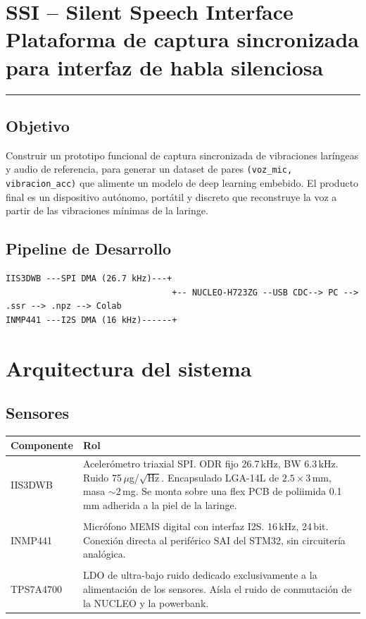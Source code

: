\documentclass[10pt,a4paper]{article}
\begin{document}
\section*{SSI -- Silent Speech Interface\\\smallskip
\small Plataforma de captura sincronizada para interfaz de habla silenciosa}

\vspace{-0.3cm}
\noindent\rule{\textwidth}{0.4pt}
\vspace{0.3cm}

\subsection*{Objetivo}

Construir un prototipo funcional de captura sincronizada de vibraciones laríngeas
y audio de referencia, para generar un dataset de pares
\texttt{(voz\_mic, vibracion\_acc)} que alimente un modelo de deep learning
embebido. El producto final es un dispositivo autónomo, portátil y discreto que
reconstruye la voz a partir de las vibraciones mínimas de la laringe.

\subsection*{Pipeline de Desarrollo}

\begin{lstlisting}[style=mini]
IIS3DWB ---SPI DMA (26.7 kHz)---+
                                 +-- NUCLEO-H723ZG --USB CDC--> PC --> .ssr --> .npz --> Colab
INMP441 ---I2S DMA (16 kHz)------+
\end{lstlisting}

\vspace{-0.3cm}
\section{Arquitectura del sistema}

\subsection*{Sensores}

\begin{tabularx}{\textwidth}{l X}
\toprule
\textbf{Componente} & \textbf{Rol} \\
\midrule
IIS3DWB & Acelerómetro triaxial SPI. ODR fijo 26.7\,kHz, BW 6.3\,kHz.
Ruido 75\,$\mu$g/$\sqrt{\text{Hz}}$. Encapsulado LGA-14L de $2.5\times3$\,mm,
masa $\sim$2\,mg. Se monta sobre una flex PCB de poliimida 0.1\,mm adherida
a la piel de la laringe.\\
\\
INMP441 & Micrófono MEMS digital con interfaz I2S. 16\,kHz, 24\,bit.
Conexión directa al periférico SAI del STM32, sin circuitería analógica.\\
\\
TPS7A4700 & LDO de ultra-bajo ruido dedicado exclusivamente a la
alimentación de los sensores. Aísla el ruido de conmutación de la
NUCLEO y la powerbank.\\
\bottomrule
\end{tabularx}
\end{document}

